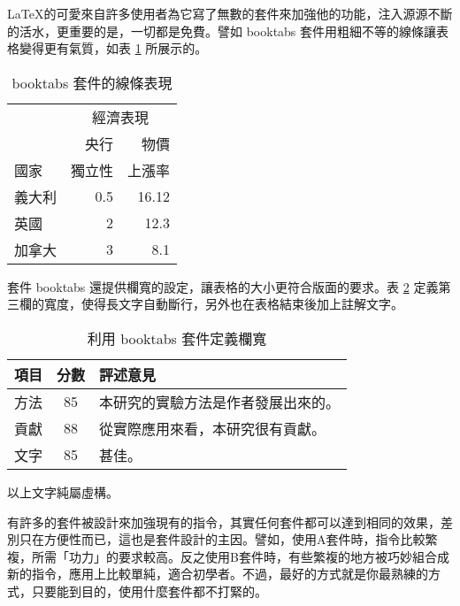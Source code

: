 \documentclass[12pt, a4paper]{article}
\begin{document}
\LaTeX 的可愛來自許多使用者為它寫了無數的套件來加強他的功能，注入源源不斷的活水，更重要的是，一切都是免費。譬如 {\A booktabs} 套件用粗細不等的線條讓表格變得更有氣質，如表 \ref{tb:basic_multi_col_2} 所展示的。

\begin{table}[ht]
    \centering
    \caption{{\C booktabs} 套件的線條表現}\label{tb:basic_multi_col_2}
    \extrarowheight=6pt
    \begin{tabular}{lrr}
    \toprule
         	& \multicolumn{2}{c}{經濟表現}\\\cmidrule(l){2-3}
            	& 央行   	& 物價 \\[-2pt]
    國家    	& 獨立性   	& 上漲率 \\\midrule
    義大利	& 0.5       	& 16.12 \\
    英國    	& 2         	& 12.3 \\
    加拿大 	& 3         	& 8.1 \\
    \bottomrule
    \end{tabular}
\end{table}

套件 {\A booktabs} 還提供欄寬的設定，讓表格的大小更符合版面的要求。表 \ref{tb:booktabs_1} 定義第三欄的寬度，使得長文字自動斷行，另外也在表格結束後加上註解文字。

\begin{table}[h]
    \centering
    \caption{利用 {\C booktabs} 套件定義欄寬}\label{tb:booktabs_1}
    \begin{tabular}{lcp{2.5cm}}%
    \toprule
    項目      & 分數	& 評述意見 \\\midrule
    方法      & 85   	& 本研究的實驗方法是作者發展出來的。 \\[2pt]
    貢獻      & 88   	& 從實際應用來看，本研究很有貢獻。 \\[2pt]
    文字      & 85   	& 甚佳。 \\
    \bottomrule
    \end{tabular}\par\smallskip %
    \parbox{5cm}{以上文字純屬虛構。}%
\end{table}

有許多的套件被設計來加強現有的指令，其實任何套件都可以達到相同的效果，差別只在方便性而已，這也是套件設計的主因。譬如，使用A套件時，指令比較繁複，所需「功力」的要求較高。反之使用B套件時，有些繁複的地方被巧妙組合成新的指令，應用上比較單純，適合初學者。不過，最好的方式就是你最熟練的方式，只要能到目的，使用什麼套件都不打緊的。
\end{document}
